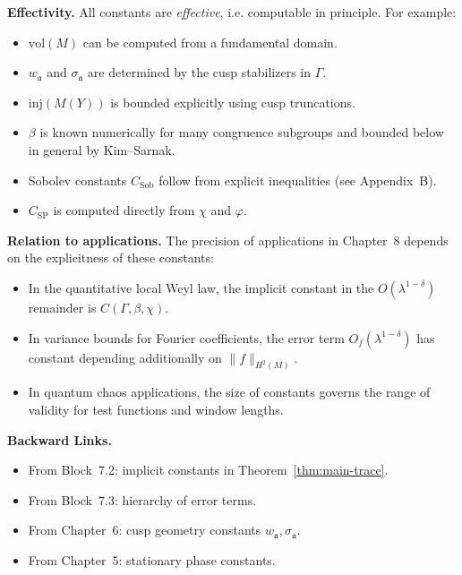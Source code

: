\medskip

\noindent\textbf{Effectivity.}
All constants are \textit{effective}, i.e. computable in principle.  
For example:
\begin{itemize}
  \item $\mathrm{vol}(M)$ can be computed from a fundamental domain.
  \item $w_\mathfrak{a}$ and $\sigma_\mathfrak{a}$ are determined by the cusp stabilizers in $\Gamma$.
  \item $\mathrm{inj}(M(Y))$ is bounded explicitly using cusp truncations.
  \item $\beta$ is known numerically for many congruence subgroups and bounded below in general by Kim–Sarnak.
  \item Sobolev constants $C_{\mathrm{Sob}}$ follow from explicit inequalities (see Appendix~B).
  \item $C_{\mathrm{SP}}$ is computed directly from $\chi$ and $\varphi$.
\end{itemize}

\medskip

\noindent\textbf{Relation to applications.}
The precision of applications in Chapter~8 depends on the explicitness of these constants:
\begin{itemize}
  \item In the quantitative local Weyl law, the implicit constant in the $O(\lambda^{1-\delta})$ remainder is $C(\Gamma,\beta,\chi)$.
  \item In variance bounds for Fourier coefficients, the error term $O_f(\lambda^{1-\delta})$ has constant depending additionally on $\|f\|_{H^2(M)}$.
  \item In quantum chaos applications, the size of constants governs the range of validity for test functions and window lengths.
\end{itemize}

\medskip

\noindent\textbf{Backward Links.}
\begin{itemize}
  \item From Block~7.2: implicit constants in Theorem~\ref{thm:main-trace}.
  \item From Block~7.3: hierarchy of error terms.
  \item From Chapter~6: cusp geometry constants $w_\mathfrak{a},\sigma_\mathfrak{a}$.
  \item From Chapter~5: stationary phase constants.
\end{itemize}

